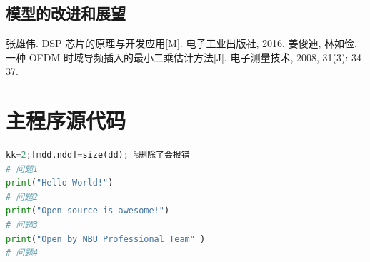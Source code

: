 \documentclass[a4paper,10pt]{my_paper}
\numberwithin{equation}{section}
\begin{document}
\subsection{模型的改进和展望}

\begin{thebibliography}{10}
张雄伟. DSP 芯片的原理与开发应用[M]. 电子工业出版社, 2016.
姜俊迪, 林如俭. 一种 OFDM 时域导频插入的最小二乘估计方法[J]. 电子测量技术, 2008, 31(3): 34-37.

\end{thebibliography}

\newpage

\appendix

\section{主程序源代码}

\begin{lstlisting}[language=Python]%设置不同语言即可。
kk=2;[mdd,ndd]=size(dd); %删除了会报错
# 问题1
print("Hello World!")
# 问题2
print("Open source is awesome!")
# 问题3
print("Open by NBU Professional Team" )
# 问题4

\end{lstlisting}
\end{document}
